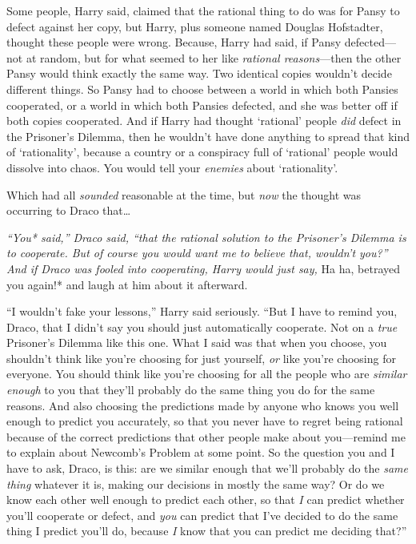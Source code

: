 Some people, Harry said, claimed that the rational thing to do was for
Pansy to defect against her copy, but Harry, plus someone named Douglas
Hofstadter, thought these people were wrong. Because, Harry had said, if
Pansy defected---not at random, but for what seemed to her like
\emph{rational reasons}---then the other Pansy would think exactly the
same way. Two identical copies wouldn't decide different things. So
Pansy had to choose between a world in which both Pansies cooperated, or
a world in which both Pansies defected, and she was better off if both
copies cooperated. And if Harry had thought `rational' people \emph{did}
defect in the Prisoner's Dilemma, then he wouldn't have done anything to
spread that kind of `rationality', because a country or a conspiracy
full of `rational' people would dissolve into chaos. You would tell your
\emph{enemies} about `rationality'.

Which had all \emph{sounded} reasonable at the time, but \emph{now} the
thought was occurring to Draco that\ldots{}

\emph{``You* said,'' Draco said, ``that the rational solution to the
Prisoner's Dilemma is to cooperate. But of course \emph{you} would want
me to believe that, wouldn't you?'' And if Draco was fooled into
cooperating, Harry would just say, }Ha ha, betrayed you again!* and
laugh at him about it afterward.

``I wouldn't fake your lessons,'' Harry said seriously. ``But I have to
remind you, Draco, that I didn't say you should just automatically
cooperate. Not on a \emph{true} Prisoner's Dilemma like this one. What I
said was that when you choose, you shouldn't think like you're choosing
for just yourself, \emph{or} like you're choosing for everyone. You
should think like you're choosing for all the people who are
\emph{similar enough} to you that they'll probably do the same thing you
do for the same reasons. And also choosing the predictions made by
anyone who knows you well enough to predict you accurately, so that you
never have to regret being rational because of the correct predictions
that other people make about you---remind me to explain about Newcomb's
Problem at some point. So the question you and I have to ask, Draco, is
this: are we similar enough that we'll probably do the \emph{same thing}
whatever it is, making our decisions in mostly the same way? Or do we
know each other well enough to predict each other, so that \emph{I} can
predict whether you'll cooperate or defect, and \emph{you} can predict
that I've decided to do the same thing I predict you'll do, because
\emph{I} know that you can predict me deciding that?''

